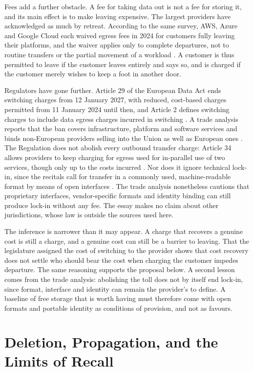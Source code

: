 \documentclass[12pt]{article}
\begin{document}
Fees add a further obstacle. A fee for taking data out is not a fee for storing it, and its main effect is to make leaving expensive. The largest providers have acknowledged as much by retreat. According to the same survey, AWS, Azure and Google Cloud each waived egress fees in 2024 for customers fully leaving their platforms, and the waiver applies only to complete departures, not to routine transfers or the partial movement of a workload \cite{ecorpit}. A customer is thus permitted to leave if the customer leaves entirely and says so, and is charged if the customer merely wishes to keep a foot in another door.

Regulators have gone further. Article 29 of the European Data Act ends switching charges from 12 January 2027, with reduced, cost-based charges permitted from 11 January 2024 until then, and Article 2 defines switching charges to include data egress charges incurred in switching \cite{dataact}. A trade analysis reports that the ban covers infrastructure, platform and software services and binds non-European providers selling into the Union as well as European ones \cite{cloudmagazin}. The Regulation does not abolish every outbound transfer charge: Article 34 allows providers to keep charging for egress used for in-parallel use of two services, though only up to the costs incurred \cite{dataact}. Nor does it ignore technical lock-in, since the recitals call for transfer in a commonly used, machine-readable format by means of open interfaces \cite{dataact}. The trade analysis nonetheless cautions that proprietary interfaces, vendor-specific formats and identity binding can still produce lock-in without any fee. The essay makes no claim about other jurisdictions, whose law is outside the sources used here.

The inference is narrower than it may appear. A charge that recovers a genuine cost is still a charge, and a genuine cost can still be a barrier to leaving. That the legislature assigned the cost of switching to the provider shows that cost recovery does not settle who should bear the cost when charging the customer impedes departure. The same reasoning supports the proposal below. A second lesson comes from the trade analysis: abolishing the toll does not by itself end lock-in, since format, interface and identity can remain the provider's to define. A baseline of free storage that is worth having must therefore come with open formats and portable identity as conditions of provision, and not as favours.

\section{Deletion, Propagation, and the Limits of Recall}
\end{document}
